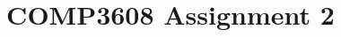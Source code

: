 \documentclass[a4paper, 12pt]{article}
\begin{document}
\title{COMP3608 Assignment 2}
\maketitle

\tableofcontents






\end{document}
